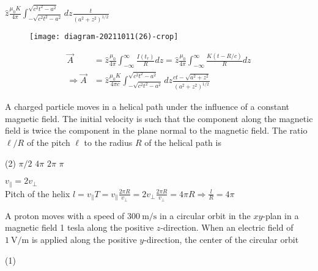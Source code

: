 \begin{enumerate}
\begin{tasks}
	\task[\textbf{D.}] $\hat{z} \frac{\mu_{0} K}{4 \pi} \int_{-\sqrt{c^{2} t^{2}-a^{2}}}^{\sqrt{c^{2} t^{2}-a^{2}}} d z \frac{t}{\left(a^{2}+z^{2}\right)^{1 / 2}}$
\end{tasks}
\begin{answer}
	\begin{figure}[H]
		\centering
		\texttt{[image: diagram-20211011(26)-crop]}
	\end{figure}
	 \begin{align*}
	\vec{A} &=\hat{z} \frac{\mu_{0}}{4 \pi} \int_{-\infty}^{\infty} \frac{I\left(t_{r}\right)}{R} d z=\hat{z} \frac{\mu_{0}}{4 \pi} \int_{-\infty}^{\infty} \frac{K(t-R / c)}{R} d z \\
	\Rightarrow \vec{A} &=\hat{z} \frac{\mu_{0} K}{4 \pi c} \int_{-\sqrt{c^{2} t^{2}-a^{2}}}^{\sqrt{c^{2} t^{2}-a^{2}}} d z \frac{c t-\sqrt{a^{2}+z^{2}}}{\left(a^{2}+z^{2}\right)^{1 / 2}}
	\end{align*}
\end{answer}
\begin{minipage}{\textwidth}
	\item A charged particle moves in a helical path under the influence of a constant magnetic field. The initial velocity is such that the component along the magnetic field is twice the component in the plane normal to the magnetic field.
	The ratio $\ell / R$ of the pitch $\ell$ to the radius $R$ of the helical path is
\end{minipage}
\begin{tasks}(2)
	\task[\textbf{A.}] $\pi / 2$
	\task[\textbf{B.}]$4 \pi$
	\task[\textbf{C.}]$2 \pi$
	\task[\textbf{D.}]$\pi$
\end{tasks}
\begin{answer}
	$v_{\|}=2 v_{\perp}$\\
	Pitch of the helix $l=v_{\|} T=v_{\|} \frac{2 \pi R}{v_{\perp}}=2 v_{\perp} \frac{2 \pi R}{v_{\perp}}=4 \pi R \Rightarrow \frac{l}{R}=4 \pi$
\end{answer}
\begin{minipage}{\textwidth}
	\item A proton moves with a speed of $300 \mathrm{~m} / \mathrm{s}$ in a circular orbit in the $x y$-plan in a magnetic field 1 tesla along the positive $z$-direction. When an electric field of $1 \mathrm{~V} / \mathrm{m}$ is applied along the positive $y$-direction, the center of the circular orbit
\end{minipage}
\begin{tasks}(1)

\end{tasks}
\end{enumerate}
